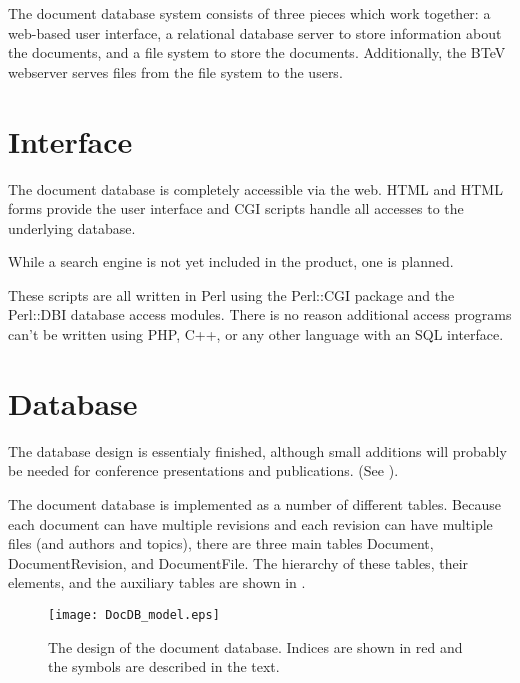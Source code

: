 \documentclass[12pt]{article}
\begin{document}
The document database system consists of three pieces which work together: a web-based
user interface, a relational database server to store information about the documents,
and a file system to store the documents. Additionally, the BTeV webserver serves
files from the file system to the users.

\section{Interface}

The document database is completely accessible via the web. HTML and HTML forms
provide the user interface and CGI scripts 
handle all accesses to the underlying database. 

While a search engine is not yet included in the product, one is planned.

These scripts are all written in Perl using the Perl::CGI package and 
the Perl::DBI database access modules. There is no reason 
additional access programs can't be written using PHP, C++, or any other 
language with an SQL interface. 

\section{Database}

The database design is essentialy finished, although small additions will
probably be needed for conference presentations and publications. (See ).

The document 
database is implemented as a number of different tables. Because each 
document can have multiple revisions and each revision can have 
multiple files (and authors and topics), there are three main tables 
Document, DocumentRevision, and DocumentFile. The hierarchy of these 
tables, their elements, and the auxiliary tables are shown in
.

\begin{figure}
\begin{center}
\texttt{[image: DocDB\_model.eps]}
\caption{The design of the document database. Indices are shown in red and the
symbols are described in the text.}
\end{center}
\end{figure}
\end{document}
